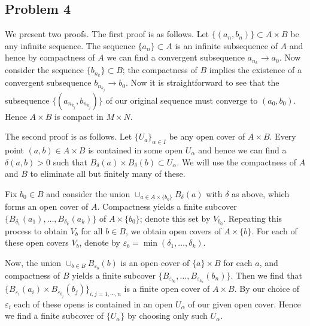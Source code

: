 \documentclass{../mathnotes}
\begin{document}
\subsection*{Problem 4}
We present two proofs. The first proof is as follows. Let $\{(a_n,b_n)\}\subset A\times B$ be any infinite
sequence. The sequence $\{a_n\}\subset A$ is an infinite subsequence of $A$ and hence by compactness of $A$ we
can find a convergent subsequence $a_{n_k}\to a_0$. Now consider the sequence $\{b_{n_k}\}\subset B$;
the compactness of $B$ implies the existence of a convergent subsequence $b_{n_{k_j}}\to b_0$. Now it is
straightforward to see that the subsequence $\{(a_{n_{k_j}},b_{n_{k_j}})\}$ of our original sequence must
converge to $(a_0,b_0)$. Hence $A\times B$ is compact in $M\times N$.


The second proof is as follows.
Let $\{U_a\}_{\alpha\in I}$ be any open cover of $A\times B$.
Every point $(a,b)\in A\times B$ is contained in some open $U_\alpha$ and hence we can find a $\delta(a,b)>0$
such that $B_\delta(a)\times B_\delta(b)\subset U_\alpha$. We will use the compactness of $A$ and $B$
to eliminate all but finitely many of these.

Fix $b_0\in B$ and consider the union $\cup_{a\in A\times \{b_0\}}B_\delta(a)$ with $\delta$ as above,
which forms an open cover of $A$.
Compactness yields a finite subcover $\{B_{\delta_1}(a_1),\ldots,B_{\delta_k}(a_k)\}$ of $A\times\{b_0\}$;
denote this set by $V_{b_0}$. Repeating this process to obtain $V_b$ for all $b\in B$, we obtain open covers
of $A\times \{b\}$. For each of these open covers $V_b$, denote by $\varepsilon_{b}=\min(\delta_1,\ldots,\delta_k)$.

Now, the union $\cup_{b\in B}B_{\varepsilon_b}(b)$ is an open cover of $\{a\}\times B$ for each $a$,
and compactness of $B$ yields a finite subcover $\{B_{\varepsilon_{b_0}},\ldots, B_{\varepsilon_{b_n}}(b_n)\}$. Then
we find that $\{B_{\varepsilon_i}(a_i)\times B_{\varepsilon_{b_j}}(b_j)\}_{i,j=1,\cdots, n}$
is a finite open cover of $A\times B$. By our choice of $\varepsilon_i$
each of these opens is contained in an open $U_\alpha$ of our given open cover.
Hence we find a finite subcover of $\{U_\alpha\}$ by choosing only such $U_\alpha$.
\end{document}
